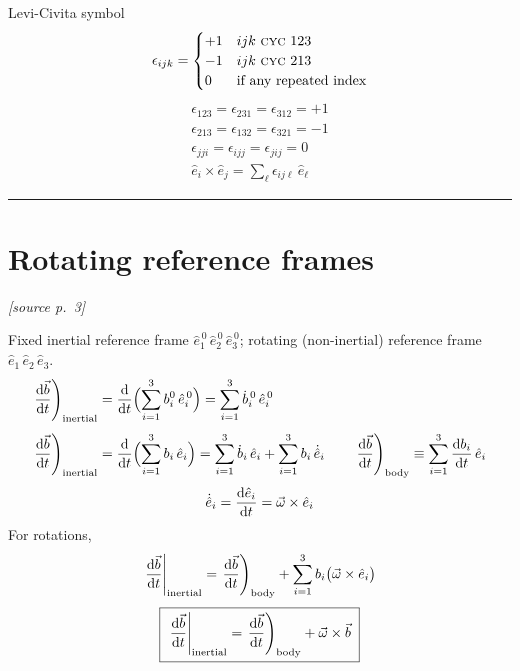 \documentclass[11pt]{article}
\newcommand{\ehat}[1]{\hat{e}_{#1}}
\newcommand{\ezero}[1]{\hat{e}^{\,0}_{#1}}
\newcommand{\src}[1]{\par\nobreak\vspace{-4pt}\hfill{\footnotesize\itshape[source p.~#1]}\par\nobreak\vspace{2pt}}
\begin{document}
Levi-Civita symbol
\begin{equation*}
\epsilon_{ijk} =
\begin{cases}
+1 & ijk \text{ \textsc{cyc} } 123\\
-1 & ijk \text{ \textsc{cyc} } 213\\
0 & \text{if any repeated index}
\end{cases}
\end{equation*}
\begin{gather*}
\epsilon_{123} = \epsilon_{231} = \epsilon_{312} = +1\\
\epsilon_{213} = \epsilon_{132} = \epsilon_{321} = -1\\
\epsilon_{jji} = \epsilon_{ijj} = \epsilon_{jij} = 0\\[2pt]
\ehat{i}\times\ehat{j} = \sum_{\ell}\epsilon_{ij\ell}\,\ehat{\ell}
\end{gather*}

\bigskip\hrule\bigskip

\section*{Rotating reference frames}
\src{3}

Fixed inertial reference frame $\ezero{1}\,\ezero{2}\,\ezero{3}$;
rotating (non-inertial) reference frame $\ehat{1}\,\ehat{2}\,\ehat{3}$.
\begin{align*}
\left.\frac{\d\vec{b}}{\d t}\right)_{\text{inertial}}
&= \frac{\d}{\d t}\Bigl(\sum_{i=1}^{3} b^{0}_i\,\ezero{i}\Bigr)
= \sum_{i=1}^{3}\dot{b}^{\,0}_i\,\ezero{i}\\[4pt]
\left.\frac{\d\vec{b}}{\d t}\right)_{\text{inertial}}
&= \frac{\d}{\d t}\Bigl(\sum_{i=1}^{3} b_i\,\ehat{i}\Bigr)
= \sum_{i=1}^{3}\dot{b}_i\,\ehat{i} + \sum_{i=1}^{3} b_i\,\dot{\hat{e}}_i
\qquad
\left.\frac{\d\vec{b}}{\d t}\right)_{\text{body}} \equiv \sum_{i=1}^{3}\frac{\d b_i}{\d t}\,\ehat{i}
\end{align*}
\begin{equation*}
\dot{\hat{e}}_i = \frac{\d\ehat{i}}{\d t} = \vec{\omega}\times\ehat{i}
\end{equation*}
For rotations,
\begin{equation*}
\left.\frac{\d\vec{b}}{\d t}\right|_{\text{inertial}}
= \left.\frac{\d\vec{b}}{\d t}\right)_{\text{body}}
+ \sum_{i=1}^{3} b_i\bigl(\vec{\omega}\times\ehat{i}\bigr)
\end{equation*}
\begin{equation*}
\boxed{\;
\left.\frac{\mathrm{d}\vec{b}}{\mathrm{d} t}\right|_{\text{inertial}}
= \left.\frac{\mathrm{d}\vec{b}}{\mathrm{d} t}\right)_{\text{body}} + \vec{\omega}\times\vec{b}\;}
\end{equation*}
\end{document}
